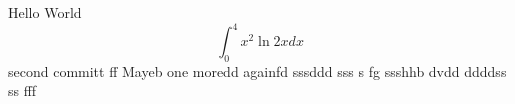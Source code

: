 \documentclass{article}
\begin{document}
Hello World
$$\int_0^4 x^2 \ln{2x}dx$$
second committ  ff
Mayeb
one moredd
againfd
sssddd sss
s fg
ssshhb dvdd ddddss ss fff
\end{document}

